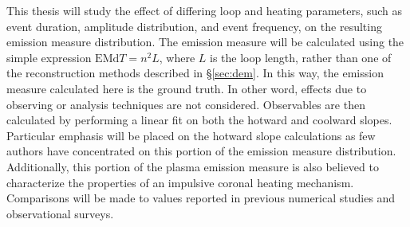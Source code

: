 \par This thesis will study the effect of differing loop and heating parameters, such as event duration, amplitude distribution, and event frequency, on the resulting emission measure distribution. The emission measure will be calculated using the simple expression $\mathrm{EM}\mathrm{d}T=n^2L$, where $L$ is the loop length, rather than one of the reconstruction methods described in \S\ref{sec:dem}. In this way, the emission measure calculated here is the ground truth. In other word, effects due to observing or analysis techniques are not considered. Observables are then calculated by performing a linear fit on both the hotward and coolward slopes. Particular emphasis will be placed on the hotward slope calculations as few authors have concentrated on this portion of the emission measure distribution. Additionally, this portion of the plasma emission measure is also believed to characterize the properties of an impulsive coronal heating mechanism. Comparisons will be made to values reported in previous numerical studies and observational surveys.
